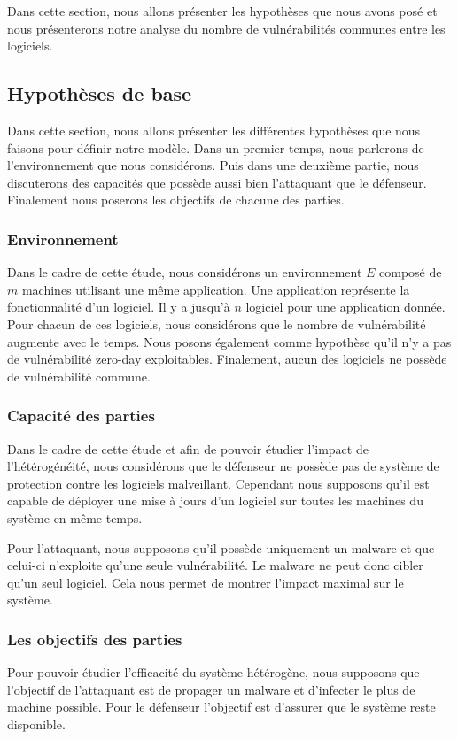 Dans cette section, nous allons présenter les hypothèses que nous avons posé et nous présenterons notre analyse du nombre de vulnérabilités communes entre les logiciels.

\subsection{Hypothèses de base}\label{sec:hypothese}
Dans cette section, nous allons présenter les différentes hypothèses que nous faisons pour définir notre modèle.
Dans un premier temps, nous parlerons de l'environnement que nous considérons.
Puis dans une deuxième partie, nous discuterons des capacités que possède aussi bien l'attaquant que le défenseur.
Finalement nous poserons les objectifs de chacune des parties.

\subsubsection{Environnement}\label{sec:hypothese:env}
Dans le cadre de cette étude, nous considérons un environnement $E$ composé de $m$ machines utilisant une même application.
Une application représente la fonctionnalité d'un logiciel.
Il y a jusqu'à $n$ logiciel pour une application donnée.
Pour chacun de ces logiciels, nous considérons que le nombre de vulnérabilité augmente avec le temps.
Nous posons également comme hypothèse qu'il n'y a pas de vulnérabilité zero-day exploitables.
Finalement, aucun des logiciels ne possède de vulnérabilité commune.


\subsubsection{Capacité des parties}\label{sec:hypothese:capacite}
Dans le cadre de cette étude et afin de pouvoir étudier l'impact de l'hétérogénéité,  nous considérons que le défenseur ne possède pas de système de protection contre les logiciels malveillant.
Cependant nous supposons qu'il est capable de déployer une mise à jours d'un logiciel sur toutes les machines du système en même temps.

Pour l'attaquant, nous supposons qu'il possède uniquement un malware et que celui-ci n'exploite qu'une seule vulnérabilité.
Le malware ne peut donc cibler qu'un seul logiciel.
Cela nous permet de montrer l'impact maximal sur le système.


\subsubsection{Les objectifs des parties}\label{sec:hypothese:objectifs}
Pour pouvoir étudier l'efficacité du système hétérogène, nous supposons que l'objectif de l'attaquant est de propager un malware et d'infecter le plus de machine possible.
Pour le défenseur l'objectif est d'assurer que le système reste disponible.


